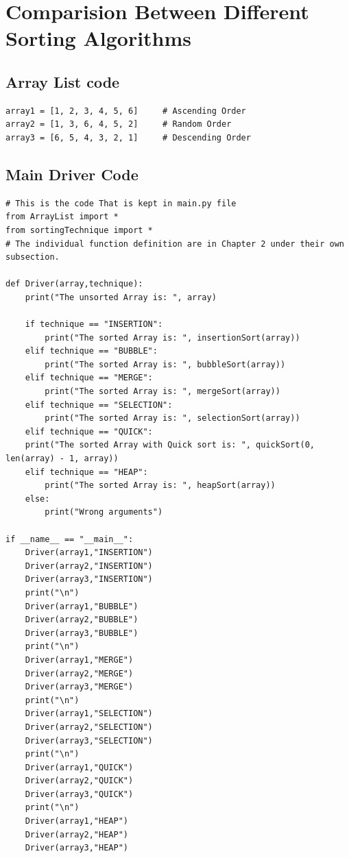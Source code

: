 \documentclass{article}
\begin{document}
\clearpage
\section{Comparision Between Different Sorting Algorithms}
\subsection{Array List code}
\begin{verbatim}
array1 = [1, 2, 3, 4, 5, 6]     # Ascending Order
array2 = [1, 3, 6, 4, 5, 2]     # Random Order
array3 = [6, 5, 4, 3, 2, 1]     # Descending Order
\end{verbatim}
\subsection{Main Driver Code}
\begin{verbatim}
# This is the code That is kept in main.py file
from ArrayList import *
from sortingTechnique import *
# The individual function definition are in Chapter 2 under their own subsection.

def Driver(array,technique):
    print("The unsorted Array is: ", array)

    if technique == "INSERTION":
        print("The sorted Array is: ", insertionSort(array))
    elif technique == "BUBBLE":
        print("The sorted Array is: ", bubbleSort(array))
    elif technique == "MERGE":
        print("The sorted Array is: ", mergeSort(array))
    elif technique == "SELECTION":
        print("The sorted Array is: ", selectionSort(array))
    elif technique == "QUICK":
    print("The sorted Array with Quick sort is: ", quickSort(0, len(array) - 1, array))
    elif technique == "HEAP":
        print("The sorted Array is: ", heapSort(array))
    else:
        print("Wrong arguments")

if __name__ == "__main__":
    Driver(array1,"INSERTION")
    Driver(array2,"INSERTION")
    Driver(array3,"INSERTION")
    print("\n")
    Driver(array1,"BUBBLE")
    Driver(array2,"BUBBLE")
    Driver(array3,"BUBBLE")
    print("\n")
    Driver(array1,"MERGE")
    Driver(array2,"MERGE")
    Driver(array3,"MERGE")
    print("\n")
    Driver(array1,"SELECTION")
    Driver(array2,"SELECTION")
    Driver(array3,"SELECTION")
    print("\n")
    Driver(array1,"QUICK")
    Driver(array2,"QUICK")
    Driver(array3,"QUICK")
    print("\n")
    Driver(array1,"HEAP")
    Driver(array2,"HEAP")
    Driver(array3,"HEAP")
\end{verbatim}
\end{document}
